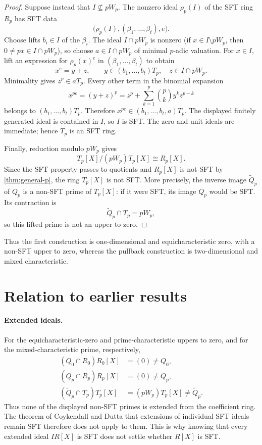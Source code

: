 \documentclass[11pt,reqno]{amsart}
\numberwithin{equation}{section}
\theoremstyle{plain}
\theoremstyle{definition}
\theoremstyle{remark}
\begin{document}
\begin{proof}
Suppose instead that $I\nsubseteq pW_p$.  The nonzero ideal $\rho_p(I)$ of
the SFT ring $R_p$ has SFT data
\[
  \bigl(\rho_p(I),(\beta_1,\ldots,\beta_t),e\bigr).
\]
Choose lifts $b_i\in I$ of the $\beta_i$.  The ideal $I\cap pW_p$ is nonzero
(if $x\in I\setminus pW_p$, then $0\neq px\in I\cap pW_p$), so choose
$a\in I\cap pW_p$ of minimal $p$-adic valuation.  For $x\in I$, lift an
expression for $\rho_p(x)^e$ in $(\beta_1,\ldots,\beta_t)$ to obtain
\[
  x^e=y+z,\qquad y\in(b_1,\ldots,b_t)T_p,\quad
  z\in I\cap pW_p.
\]
Minimality gives $z^p\in aT_p$.  Every other term in the binomial expansion
\[
  x^{pe}=(y+z)^p
    =z^p+\sum_{k=1}^p\binom{p}{k}y^kz^{p-k}
\]
belongs to $(b_1,\ldots,b_t)T_p$.  Therefore
$x^{pe}\in(b_1,\ldots,b_t,a)T_p$.  The displayed finitely generated ideal
is contained in $I$, so $I$ is SFT.  The zero and unit ideals are immediate;
hence $T_p$ is an SFT ring.

Finally, reduction modulo $pW_p$ gives
\[
  T_p[X]/(pW_p)T_p[X]\cong R_p[X].
\]
Since the SFT property passes to quotients and $R_p[X]$ is not SFT by
\cref{thm:general-p}, the ring $T_p[X]$ is not SFT.  More precisely, the
inverse image $\widetilde Q_p$ of $Q_p$ is a non-SFT prime of $T_p[X]$: if
it were SFT, its image $Q_p$ would be SFT.  Its contraction is
\[
  \widetilde Q_p\cap T_p=pW_p,
\]
so this lifted prime is not an upper to zero.
\end{proof}

Thus the first construction is one-dimensional and equicharacteristic zero,
with a non-SFT upper to zero, whereas the pullback construction is
two-dimensional and mixed characteristic.

\section{Relation to earlier results}
\label{sec:discussion}

\paragraph*{Extended ideals.}
For the equicharacteristic-zero and prime-characteristic uppers to zero,
and for the mixed-characteristic prime, respectively,
\[
\begin{aligned}
 (Q_0\cap R_0)R_0[X]&=(0)\neq Q_0,\\
 (Q_p\cap R_p)R_p[X]&=(0)\neq Q_p,\\
 (\widetilde Q_p\cap T_p)T_p[X]&=(pW_p)T_p[X]\neq\widetilde Q_p.
\end{aligned}
\]
Thus none of the displayed non-SFT primes is extended from the coefficient
ring.  The theorem of Coykendall and Dutta that extensions of individual SFT
ideals remain SFT therefore does not apply to them.  This is why knowing that
every extended ideal $IR[X]$ is SFT does not settle whether $R[X]$ is SFT.
\end{document}

